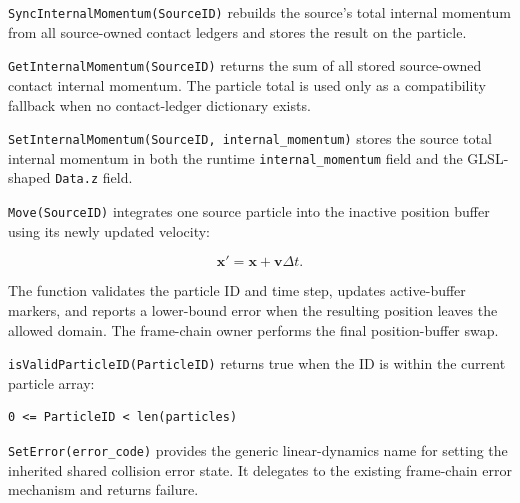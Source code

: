 
\texttt{SyncInternalMomentum(SourceID)} rebuilds the source's total internal
momentum from all source-owned contact ledgers and stores the result on the
particle.


\texttt{GetInternalMomentum(SourceID)} returns the sum of all stored
source-owned contact internal momentum.  The particle total is used only as a
compatibility fallback when no contact-ledger dictionary exists.


\texttt{SetInternalMomentum(SourceID, internal\_momentum)} stores the source
total internal momentum in both the runtime \texttt{internal\_momentum} field
and the GLSL-shaped \texttt{Data.z} field.


\texttt{Move(SourceID)} integrates one source particle into the inactive
position buffer using its newly updated velocity:

\begin{equation}
\mathbf{x}' = \mathbf{x}+\mathbf{v}\Delta t.
\end{equation}

The function validates the particle ID and time step, updates active-buffer
markers, and reports a lower-bound error when the resulting position leaves the
allowed domain.  The frame-chain owner performs the final position-buffer swap.


\texttt{isValidParticleID(ParticleID)} returns true when the ID is within the
current particle array:

\begin{verbatim}
0 <= ParticleID < len(particles)
\end{verbatim}


\texttt{SetError(error\_code)} provides the generic linear-dynamics name for
setting the inherited shared collision error state.  It delegates to the
existing frame-chain error mechanism and returns failure.
